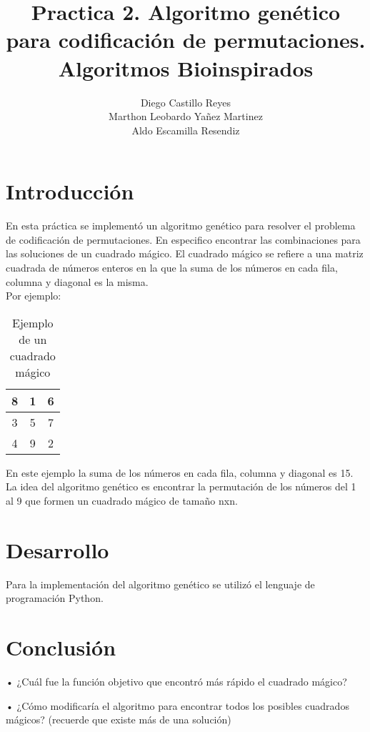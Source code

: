\documentclass{report}
\title{\Huge{\textbf{Practica 2. Algoritmo genético para codificación de permutaciones.}}\\
\Large{\textbf{Algoritmos Bioinspirados}}}
\author{Diego Castillo Reyes\\Marthon Leobardo Yañez Martinez\\Aldo Escamilla Resendiz}
\begin{document}
    \maketitle
    \tableofcontents
    \newpage

    \section{Introducción}
    En esta práctica se implementó un algoritmo genético para resolver el problema de codificación de 
    permutaciones. En especifico encontrar las combinaciones para las soluciones de un cuadrado mágico.
    El cuadrado mágico se refiere a una matriz cuadrada de números enteros en la que la suma de los números 
    en cada fila, columna y diagonal es la misma.\\

    Por ejemplo: 
    \begin{table}[H]
        \centering
        \begin{tabular}{|c|c|c|}
            \hline
            8 & 1 & 6\\
            \hline
            3 & 5 & 7\\
            \hline
            4 & 9 & 2\\
            \hline
        \end{tabular}
        \caption{Ejemplo de un cuadrado mágico}
    \end{table}
    En este ejemplo la suma de los números en cada fila, columna y diagonal es 15.\\
    La idea del algoritmo genético es encontrar la permutación de los números del 
    1 al 9 que formen un cuadrado mágico de tamaño nxn.\\

    \section{Desarrollo}
    Para la implementación del algoritmo genético se utilizó el lenguaje de programación Python.
    
    \section{Conclusión}
    •  ¿Cuál fue la función objetivo que encontró más rápido el cuadrado mágico?


    •  ¿Cómo modificaría el algoritmo para encontrar todos los posibles cuadrados mágicos? (recuerde que existe más de una solución)
\end{document}
